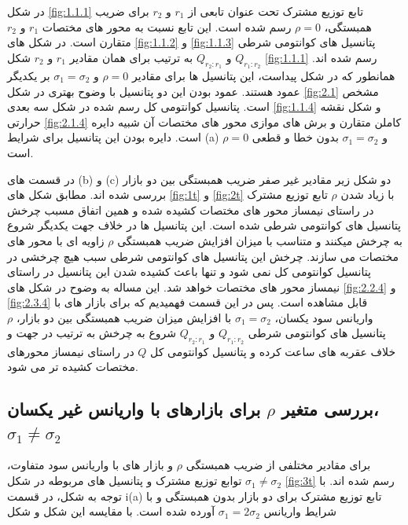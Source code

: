 \documentclass[a4paper,titlepage,12pt,fleqn,oneside]{report}
\begin{document}
در شکل 
\ref{fig:1.1.1}
تابع توزیع مشترک تحت عنوان تابعی از 
$r_1$
و
$r_2$
برای ضریب همبستگی، 
$\rho=0$
رسم شده است. این تابع نسبت به محور های مختصات 
$r_1$
و
$r_2$
متقارن است. در شکل های 
\ref{fig:1.1.2}
و
\ref{fig:1.1.3}
پتانسیل های کوانتومی شرطی 
$Q_{r_1:r_2}$
و
$Q_{r_2:r_1}$
به ترتیب برای همان مقادیر 
$r_1$
و
$r_2$
شکل
\ref{fig:1.1.1}
رسم شده اند. همانطور که در شکل پیداست، این پتانسیل ها برای مقادیر 
$\rho=0$
و 
$\sigma_1=\sigma_2$
بر یکدیگر عمود هستند. عمود بودن این دو پتانسیل با وضوح بهتری در شکل 
\ref{fig:2.1}
مشخص است. پتانسیل کوانتومی کل رسم شده در شکل سه بعدی
\ref{fig:1.1.4}
و شکل نقشه حرارتی 
\ref{fig:2.1.4}
کاملن متقارن و برش های موازی محور های مختصات آن شبیه دایره است. دایره  بودن این پتانسیل برای شرایط (a)
$\rho=0$
و 
$\sigma_1=\sigma_2$
بدون خطا و قطعی است.

در قسمت های (b) و (c) دو شکل زیر مقادیر غیر صفر ضریب همبستگی بین دو بازار بررسی شده اند.
مطابق شکل های
\ref{fig:1t}
و 
\ref{fig:2t}
با زیاد شدن 
$\rho$
تابع توزیع مشترک در راستای نیمساز محور های مختصات کشیده شده و همین اتفاق مسبب چرخش پتانسیل های کوانتومی شرطی شده است. این پتانسیل ها در خلاف جهت یکدیگر شروع به چرخش میکنند و متناسب با میزان افزایش ضریب همبستگی 
$\rho$
زاویه ای با محور های مختصات می سازند. چرخش این پتانسیل های کوانتومی شرطی سبب هیچ چرخشی در پتانسیل کوانتومی کل نمی شود و تنها باعث کشیده شدن این پتانسیل در راستای نیمساز محور های مختصات خواهد شد. این مساله به وضوح در شکل های
\ref*{fig:2.2.4}
و 
\ref*{fig:2.3.4}
قابل مشاهده است.
پس در این قسمت فهمیدیم که برای بازار های با واریانس سود یکسان، 
$\sigma_1=\sigma_2$
 با افزایش میزان ضریب همبستگی بین دو بازار، 
  $\rho$
   پتانسیل های کوانتومی شرطی 
   $Q_{r_1:r_2}$
   و
   $Q_{r_2:r_1}$
   شروع به چرخش به ترتیب در جهت و خلاف عقربه های ساعت کرده و پتانسیل کوانتومی کل 
   $Q$
   در راستای نیمساز محورهای مختصات کشیده تر می شود. 
   
\subsection{
	بررسی متغیر 
	$\rho$
	برای بازارهای با واریانس غیر  یکسان،
	$\sigma_1 \neq \sigma_2$
}
برای مقادیر مختلفی از ضریب همبستگی 
$\rho$
و بازار های با واریانس سود متفاوت،
$\sigma_1 \neq \sigma_2$
توابع توزیع مشترک و پتانسیل های مربوطه در شکل 
\ref{fig:3t}
رسم شده اند.  با توجه به شکل، در قسمت i(a) تابع توزیع مشترک برای دو بازار بدون همبستگی و با شرایط واریانس
$\sigma_1 =2\sigma_2$
آورده شده است. با مقایسه این شکل و شکل 
\end{document}
